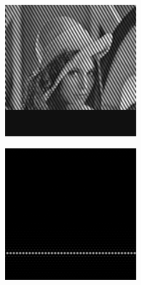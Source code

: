 \begin{figure}[h]
\begin{subfigure}[t]{0.23\textwidth}
        \caption{}
    \end{subfigure}\hfill
    \begin{subfigure}[t]{0.23\textwidth}
        \centering
        \includegraphics[width=\textwidth]{sim_slit/3/sim_vert_frame}
        \caption{}
    \end{subfigure}\hfill
    \begin{subfigure}[t]{0.23\textwidth}
        \centering
        \includegraphics[width=\textwidth]{sim_slit/3/sim_slit_pattern}

\end{subfigure}
\end{figure}

